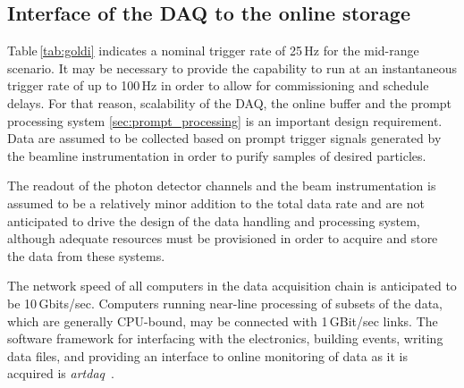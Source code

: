 \subsection{Interface of the DAQ to the online storage}
\label{sec:DAQ_online_interface}



Table\,\ref{tab:goldi} indicates a nominal trigger rate of 25\,Hz for
the mid-range scenario. It may be necessary to provide the capability
to run at  an instantaneous trigger rate of up to 100\,Hz in order to
allow for commissioning and schedule delays. For that reason,
scalability of the DAQ, the online buffer and the prompt processing system
\ref{sec:prompt_processing} is an important design requirement.
 Data are assumed to be
collected based on prompt trigger signals generated by the beamline
instrumentation in order to purify samples of desired particles.

The readout of the photon detector channels
 and the beam
instrumentation is assumed to be a relatively minor addition to the
total data rate and are not anticipated to drive the design of the
data handling and processing system, although adequate resources must
be provisioned in order to acquire and store the data from these
systems.

The network speed of all computers in the data acquisition
chain is anticipated to be 10\,Gbits/sec. 
 Computers running near-line
processing of subsets of the data, which are generally CPU-bound, may
be connected with 1\,GBit/sec links.  The software framework for
interfacing with the electronics, building events, writing data files,
and providing an interface to online monitoring of data as it is
acquired is {\it artdaq}~\cite{artdaq}.

